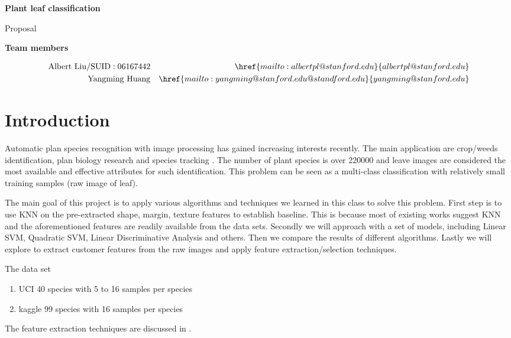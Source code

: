 \documentclass{article}
\begin{document}
{\Large \textbf{Plant leaf classification}\par}
{\Large Proposal\par}
\hrulefill \par
{\bf Team members\par}
\begin{align*}
\mathrm{Albert\ Liu/SUID: 06167442} &&\href{mailto:albertpl@stanford.edu}{albertpl@stanford.edu}\\
\mathrm{Yangming\ Huang} &&\href{mailto:yangming@stanford.edu@standford.edu}{yangming@stanford.edu}\\
\end{align*}

\section{Introduction}
Automatic plan species recognition with image processing has gained increasing interests recently. The main application are crop/weeds identification, plan biology research and species tracking \cite{Pedro13}. The number of plant species is over 220000 and leave images are considered the most available and effective attributes for such identification.  This problem can be seen as a multi-class classification with relatively small training samples (raw image of leaf).  

The main goal of this project is to apply various algorithms and techniques we learned in this class to solve this problem. First step is to use KNN on the pre-extracted {shape, margin, texture} features to establish baseline. This is because most of existing works \cite{Charles13} \cite{Pedro13} suggest KNN and the aforementioned features are readily available from the data sets.  Secondly we will approach with a set of models, including Linear SVM, Quadratic SVM, Linear Discriminative Analysis and others. Then we compare the results of different algorithms. Lastly we will explore to extract customer features from the raw images and apply feature extraction/selection techniques.

The data set 
\begin{enumerate}
  \item UCI \cite{UCIDataSet} 40 species with 5 to 16 samples per species
  \item kaggle \cite{KaggleDataSet} 99 species with 16 samples per species
\end{enumerate}

The feature extraction techniques are discussed in \cite{Pedro13}.
\end{document}
